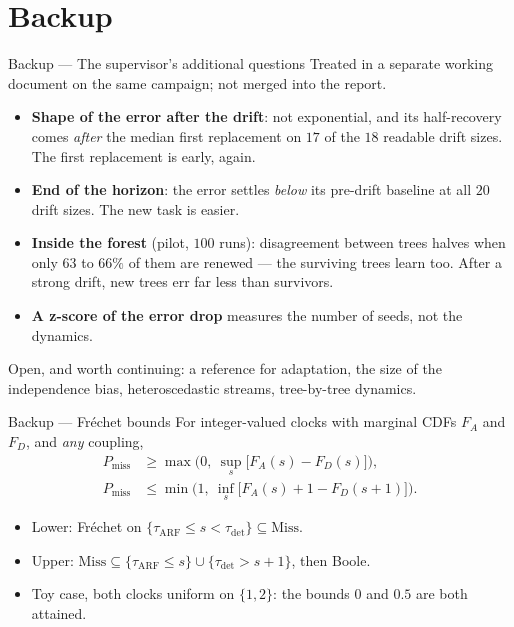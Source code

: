 \documentclass[aspectratio=169,11pt]{beamer}
\begin{document}
\appendix
\section*{Backup}

\begin{frame}{Backup --- The supervisor's additional questions}
  {\small Treated in a separate working document on the same campaign; not merged into the report.}
  \begin{itemize}
    \item \textbf{Shape of the error after the drift}: not exponential, and its half-recovery comes
          \emph{after} the median first replacement on $17$ of the $18$ readable drift sizes.
          The first replacement is early, again.
    \item \textbf{End of the horizon}: the error settles \emph{below} its pre-drift baseline at all
          $20$ drift sizes. The new task is easier.
    \item \textbf{Inside the forest} (pilot, $100$ runs): disagreement between trees halves when only
          $63$ to $66\%$ of them are renewed --- the surviving trees learn too. After a strong drift,
          new trees err far less than survivors.
    \item \textbf{A z-score of the error drop} measures the number of seeds, not the dynamics.
  \end{itemize}
  \vfill
  {\small\color{gray} Open, and worth continuing: a reference for adaptation, the size of the
  independence bias, heteroscedastic streams, tree-by-tree dynamics.}
\end{frame}

\begin{frame}{Backup --- Fréchet bounds}
  For integer-valued clocks with marginal CDFs $F_A$ and $F_D$, and \emph{any} coupling,
  \begin{align*}
    P_{\mathrm{miss}} &\ge \max\Big(0,\ \sup_{s} \big[F_A(s)-F_D(s)\big]\Big),\\
    P_{\mathrm{miss}} &\le \min\Big(1,\ \inf_{s} \big[F_A(s) + 1 - F_D(s+1)\big]\Big).
  \end{align*}
  \begin{itemize}
    \item Lower: Fréchet on $\{\tau_{\mathrm{ARF}} \le s < \tau_{\mathrm{det}}\} \subseteq \mathrm{Miss}$.
    \item Upper: $\mathrm{Miss} \subseteq \{\tau_{\mathrm{ARF}} \le s\} \cup \{\tau_{\mathrm{det}} > s+1\}$, then Boole.
    \item Toy case, both clocks uniform on $\{1,2\}$: the bounds $0$ and $0.5$ are both attained.
  \end{itemize}
\end{frame}
\end{document}
